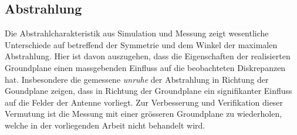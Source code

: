 \subsection{Abstrahlung}
Die Abstrahlcharakteristik aus Simulation und Messung zeigt wesentliche
Unterschiede auf betreffend der Symmetrie und dem Winkel der maximalen
Abstrahlung. Hier ist davon auszugehen, dass die Eigenschaften der
realisierten Groundplane einen massgebenden Einfluss auf die beobachteten
Diskrepanzen hat. Insbesondere die gemessene \emph{unruhe} der Abstrahlung
in Richtung der Goundplane zeigen, dass in Richtung der Groundplane ein
signifikanter Einfluss auf die Felder der Antenne vorliegt. Zur
Verbesserung und Verifikation dieser Vermutung ist die Messung mit einer
grösseren Groundplane zu wiederholen, welche in der vorliegenden Arbeit
nicht behandelt wird. 
